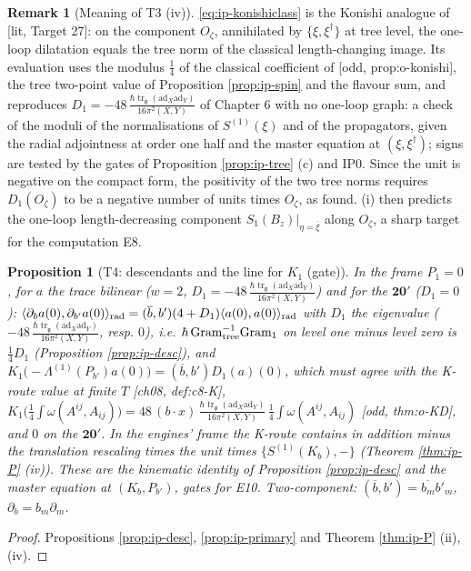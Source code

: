 \documentclass[11pt]{report}
\theoremstyle{plain}
\newtheorem{proposition}[theorem]{Proposition}
\theoremstyle{definition}
\newtheorem{remark}[theorem]{Remark}
\numberwithin{equation}{chapter}
\newcommand{\unit}{\tfrac{\hbar\operatorname{tr}_{\mathfrak g}(\mathrm{ad}_X\mathrm{ad}_Y)}{16\pi^2(X,Y)}}
\newcommand{\Gt}{\mathrm{Gram}_{\rm tree}}
\newcommand{\Go}{\mathrm{Gram}_{1}}
\newcommand{\rad}{{\rm rad}}
\begin{document}
\begin{remark}[Meaning of T3 (iv)]
\label{rem:ip-bps}
\eqref{eq:ip-konishiclass} is the Konishi analogue of [lit, Target 27]: on the component $O_\zeta$, annihilated by $\{\xi,\xi^\dagger\}$ at tree level, the one-loop dilatation equals the tree norm of the classical length-changing image. Its evaluation uses the modulus $\tfrac14$ of the classical coefficient of [odd, prop:o-konishi], the tree two-point value of Proposition \ref{prop:ip-spin} and the flavour sum, and reproduces $D_1=-48\,\unit$ of Chapter 6 with no one-loop graph: a check of the moduli of the normalisations of $S^{(1)}(\xi)$ and of the propagators, given the radial adjointness at order one half and the master equation at $(\xi,\xi^\dagger)$; signs are tested by the gates of Proposition \ref{prop:ip-tree} (c) and IP0. Since the unit is negative on the compact form, the positivity of the two tree norms requires $D_1(O_\zeta)$ to be a negative number of units times $O_\zeta$, as found. (i) then predicts the one-loop length-decreasing component $S_1(B_z)|_{\eta=\overline\xi}$ along $O_\zeta$, a sharp target for the computation E8.
\end{remark}

\begin{proposition}[T4: descendants and the line for $K_1$ (gate)]
\label{prop:ip-Kline}
In the frame $P_1=0$, for $a$ the trace bilinear ($w=2$, $D_1=-48\,\unit$) and for the $\mathbf{20'}$ ($D_1=0$): $\langle\partial_ba(0),\partial_{b'}a(0)\rangle_\rad=(\overline b,b')(4+D_1)\langle a(0),a(0)\rangle_\rad$ with $D_1$ the eigenvalue ($-48\,\unit$, resp. $0$), i.e. $\hbar\,\Gt^{-1}\Go$ on level one minus level zero is $\tfrac14D_1$ (Proposition \ref{prop:ip-desc}), and $K_1\big(-\Lambda^{(1)}(P_{b'})a(0)\big)=(\overline b,b')D_1(a)(0)$, which must agree with the K-route value at finite $T$ [ch08, def:c8-K], $K_1\big(\tfrac14\int\omega(A^{ij},A_{ij})\big)=48\,(b\cdot x)\,\unit\,\tfrac14\int\omega(A^{ij},A_{ij})$ [odd, thm:o-KD], and $0$ on the $\mathbf{20'}$. In the engines' frame the K-route contains in addition minus the translation rescaling times the unit times $\{S^{(1)}(K_b),-\}$ (Theorem \ref{thm:ip-P} (iv)). These are the kinematic identity of Proposition \ref{prop:ip-desc} and the master equation at $(K_b,P_{b'})$, gates for E10. Two-component: $(\overline b,b')=\overline{b_m}b'_m$, $\partial_b=b_m\partial_m$.
\end{proposition}

\begin{proof}
Propositions \ref{prop:ip-desc}, \ref{prop:ip-primary} and Theorem \ref{thm:ip-P} (ii), (iv).
\end{proof}
\end{document}
